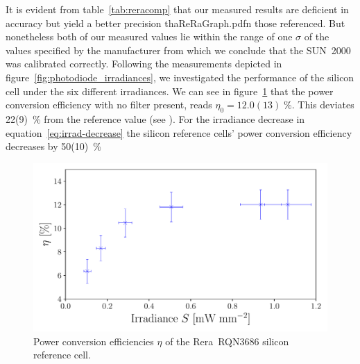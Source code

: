 \documentclass[a4paper,10pt,twocolumn]{article}
\begin{document}
\begin{extract*}
It is evident from table~\ref{tab:reracomp} that our measured results are deficient in accuracy but yield a better precision thaReRaGraph.pdfn those referenced. But nonetheless both of our measured values lie within the range of one $\sigma$ of the values specified by the manufacturer from which we conclude that the SUN~2000 was calibrated correctly.\mypar
Following the measurements depicted in figure~\ref{fig:photodiode_irradiances}, we investigated the performance of the silicon cell under the six different irradiances. We can see in figure~\ref{fig:reraPCE} that the power conversion efficiency with no filter present, reads $\eta_0 = 12.0(13)\;\%$. This deviates 22(9)~\% from the reference value (see \cite{reracat}). For the irradiance decrease in equation~\ref{eq:irrad-decrease} the silicon reference cells’ power conversion efficiency decreases by 50(10)~\%
\begin{figure}[H]\centering
	\includegraphics[scale=.5]{../2_Pictures/ReRaGraph.pdf}
	\caption{Power conversion efficiencies $\eta$ of the Rera~RQN3686 silicon reference cell.}
	\label{fig:reraPCE}
\end{figure}


\end{extract*}
\end{document}
